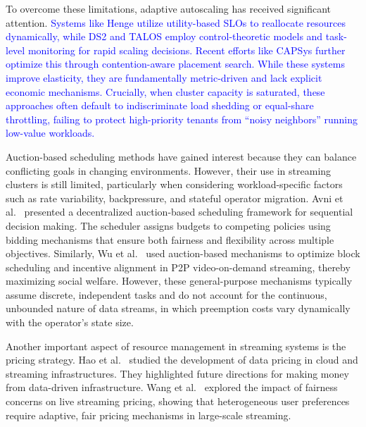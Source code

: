 \documentclass[lettersize,journal]{IEEEtran}
\begin{document}
To overcome these limitations, adaptive autoscaling has received significant attention. \textcolor{blue}{Systems like Henge \cite{10.1145/3267809.3267832} utilize utility-based SLOs to reallocate resources dynamically, while DS2 \cite{kalavri2018three} and TALOS \cite{ntouni2024talos} employ control-theoretic models and task-level monitoring for rapid scaling decisions. Recent efforts like CAPSys \cite{wang2025capsys} further optimize this through contention-aware placement search. While these systems improve elasticity, they are fundamentally metric-driven and lack explicit economic mechanisms. Crucially, when cluster capacity is saturated, these approaches often default to indiscriminate load shedding or equal-share throttling, failing to protect high-priority tenants from ``noisy neighbors'' running low-value workloads.}

Auction-based scheduling methods have gained interest because they can balance conflicting goals in changing environments. However, their use in streaming clusters is still limited, particularly when considering workload-specific factors such as rate variability, backpressure, and stateful operator migration. Avni et al.~\cite{avni2024auction} presented a decentralized auction-based scheduling framework for sequential decision making. The scheduler assigns budgets to competing policies using bidding mechanisms that ensure both fairness and flexibility across multiple objectives. Similarly, Wu et al.~\cite{wu2012auction} used auction-based mechanisms to optimize block scheduling and incentive alignment in P2P video-on-demand streaming, thereby maximizing social welfare. However, these general-purpose mechanisms typically assume discrete, independent tasks and do not account for the continuous, unbounded nature of data streams, in which preemption costs vary dynamically with the operator's state size.

Another important aspect of resource management in streaming systems is the pricing strategy. Hao et al.~\cite{hao2023evolution} studied the development of data pricing in cloud and streaming infrastructures. They highlighted future directions for making money from data-driven infrastructure. Wang et al.~\cite{wang2022analysis} explored the impact of fairness concerns on live streaming pricing, showing that heterogeneous user preferences require adaptive, fair pricing mechanisms in large-scale streaming.
\end{document}

